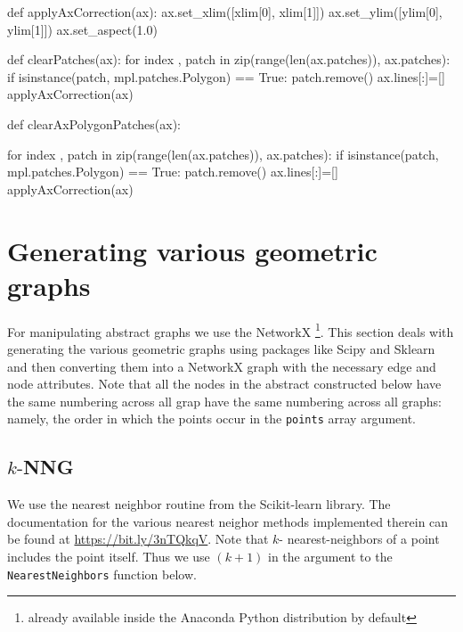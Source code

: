 \nwenddocs{}\plusendmoddef\nwstartdeflinemarkup{}\nwenddeflinemarkup
def applyAxCorrection(ax):
      ax.set_xlim([xlim[0], xlim[1]])
      ax.set_ylim([ylim[0], ylim[1]])
      ax.set_aspect(1.0)

def clearPatches(ax):
    for index , patch in zip(range(len(ax.patches)), ax.patches):
        if isinstance(patch, mpl.patches.Polygon) == True:
            patch.remove()
    ax.lines[:]=[]
    applyAxCorrection(ax)

def clearAxPolygonPatches(ax):

    for index , patch in zip(range(len(ax.patches)), ax.patches):
        if isinstance(patch, mpl.patches.Polygon) == True:
            patch.remove()
    ax.lines[:]=[]
    applyAxCorrection(ax)
\nwendcode{}\nwdocspar


\section{Generating various geometric graphs}

For manipulating abstract graphs we use the NetworkX \cite{hagberg2008exploring} \footnote{already available inside the Anaconda Python distribution by default}. 
This section deals with generating the various geometric graphs using packages like Scipy and Sklearn and then converting them into a NetworkX graph
with the necessary edge and node attributes. Note that all the nodes in the abstract constructed below have the same numbering across all grap have the same 
numbering across all graphs: namely, the order in which the points occur in the \verb|points| array argument. 


\subsection{$k\text{-}$NNG}

We use the nearest neighbor routine from the Scikit-learn \cite{pedregosa2011scikit} library. The documentation
for the various nearest neighor methods implemented therein can be found at 
\url{https://bit.ly/3nTQkqV}. Note that $k\text{-}$ nearest-neighbors of a point
includes the point itself. Thus we use $(k+1)$ in the argument to the \verb|NearestNeighbors| 
function below. 

